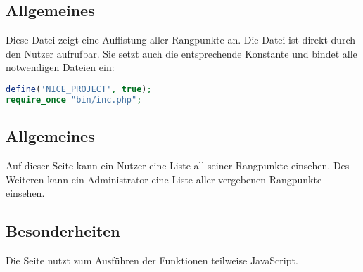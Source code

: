 \subsection{Allgemeines} Diese Datei zeigt eine Auflistung aller Rangpunkte an.
Die Datei ist direkt durch den Nutzer aufrufbar. Sie setzt auch die entsprechende Konstante und bindet alle notwendigen Dateien ein:
\begin{lstlisting}[language=php]
define('NICE_PROJECT', true);
require_once "bin/inc.php";
\end{lstlisting}
\subsection{Allgemeines}
Auf dieser Seite kann ein Nutzer eine Liste all seiner Rangpunkte einsehen. Des Weiteren kann ein Administrator eine Liste aller vergebenen Rangpunkte einsehen.
\subsection{Besonderheiten}
Die Seite nutzt zum Ausführen der Funktionen teilweise JavaScript.
